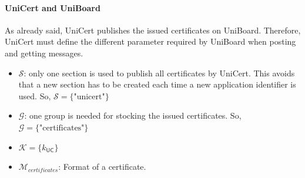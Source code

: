\documentclass[bibtotoc,halfparskip,oneside]{scrreprt}
\newcommand{\vk}[1]{\mathit{vk}_{#1}\xspace}
\newcommand{\vkbar}[1]{\bar{\mathit{vk}}_{#1}\xspace}
\newcommand{\CA}{\ensuremath{\mathsf{CA}}\xspace}
\newcommand{\UC}{\ensuremath{\mathsf{UC}}\xspace}
\newcommand{\Voter}[1]{\ensuremath{\mathsf{V}_{#1}}\xspace}
\begin{document}

\paragraph*{UniCert and UniBoard} As already said, UniCert publishes the issued certificates on UniBoard. Therefore, UniCert must define the different parameter required by UniBoard when posting and getting messages.

\begin{itemize}
	\item $\mathcal{S}$: only one section is used to publish all certificates by UniCert. This avoids that a new section has to be created each time a new application identifier is used. So, $\mathcal{S} = \{\text{"unicert"}\}$
	\item $\mathcal{G}$: one group is needed for stocking the issued certificates. So, $\mathcal{G} = \{\text{"certificates"}\}$
	\item $\mathcal{K} = \{k_{\UC}\}$
	\item $\mathcal{M}_{certificates}$: Format of a certificate.
\end{itemize}

\end{document}
